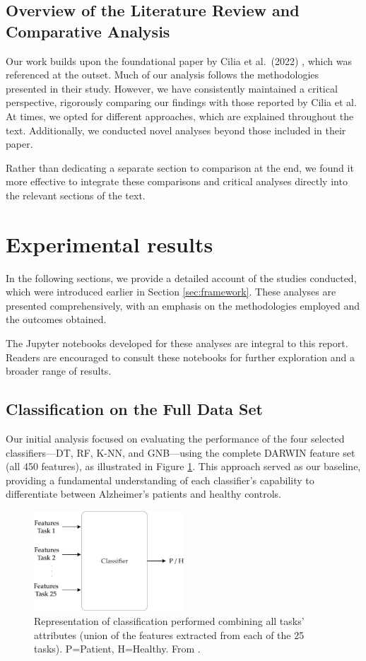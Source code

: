 \documentclass[a4paper, 11pt]{article}
\begin{document}
\subsection{Overview of the Literature Review and Comparative Analysis}
Our work builds upon the foundational paper by Cilia et al.~(2022) \cite{Cilia2022}, which was referenced at the outset. Much of our analysis follows the methodologies presented in their study. However, we have consistently maintained a critical perspective, rigorously comparing our findings with those reported by Cilia et al. At times, we opted for different approaches, which are explained throughout the text. Additionally, we conducted novel analyses beyond those included in their paper. 

Rather than dedicating a separate section to comparison at the end, we found it more effective to integrate these comparisons and critical analyses directly into the relevant sections of the text.

\section{Experimental results}
In the following sections, we provide a detailed account of the studies conducted, which were introduced earlier in Section \ref{sec:framework}. These analyses are presented comprehensively, with an emphasis on the methodologies employed and the outcomes obtained. 

The Jupyter notebooks developed for these analyses are integral to this report. Readers are encouraged to consult these notebooks for further exploration and a broader range of results.

\subsection{Classification on the Full Data Set} \label{sec:baseline}
Our initial analysis focused on evaluating the performance of the four selected classifiers—DT, RF, K-NN, and GNB—using the complete DARWIN feature set (all 450 features), as illustrated in Figure \ref{fig:immagine1}. This approach served as our baseline, providing a fundamental understanding of each classifier's capability to differentiate between Alzheimer's patients and healthy controls.

\begin{figure}[h!]
    \centering
    \includegraphics[width=0.5\textwidth]{Figures/immagine1.jpg}
    \caption{\footnotesize{Representation of classification performed combining all tasks' attributes (union of the features extracted from each of the 25 tasks). P=Patient, H=Healthy. From \cite{Cilia2022}.}}
    \label{fig:immagine1}
\end{figure}
\end{document}
